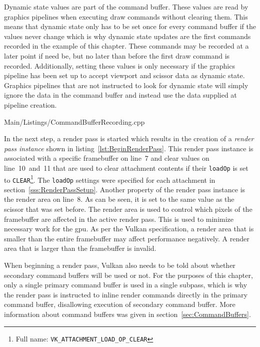       Dynamic state values are part of the command buffer.
      These values are read by graphics pipelines when executing draw commands without clearing them.
      This means that dynamic state only has to be set once for every command buffer if the values never change which is why dynamic state updates are the first commands recorded in the example of this chapter.
      These commands may be recorded at a later point if need be, but no later than before the first draw command is recorded.
      Additionally, setting these values is only necessary if the graphics pipeline has been set up to accept viewport and scissor data as dynamic state.
      Graphics pipelines that are not instructed to look for dynamic state will simply ignore the data in the command buffer and instead use the data supplied at pipeline creation.

      
      {Main/Listings/CommandBufferRecording.cpp}

      In the next step, a render pass is started which results in the creation of a \textit{render pass instance} shown in listing~\ref{lst:BeginRenderPass}.
      This render pass instance is associated with a specific framebuffer on line~7 and clear values on line~10~and~11 that are used to clear attachment contents if their \lstinline{loadOp} is set to \lstinline{CLEAR}\footnote{Full name: \lstinline{VK_ATTACHMENT_LOAD_OP_CLEAR}}.
      The \lstinline{loadOp} settings were specified for each attachment in section~\ref{sss:RenderPassSetup}.
      Another property of the render pass instance is the render area on line~8.
      As can be seen, it is set to the same value as the scissor that was set before.
      The render area is used to control which pixels of the framebuffer are affected in the active render pass.
      This is used to minimize necessary work for the \gls{gpu}.
      As per the Vulkan specification, a render area that is smaller than the entire framebuffer may affect performance negatively.
      A render area that is larger than the framebuffer is invalid.

      When beginning a render pass, Vulkan also needs to be told about whether secondary command buffers will be used or not.
      For the purposes of this chapter, only a single primary command buffer is used in a single subpass, which is why the render pass is instructed to inline render commands directly in the primary command buffer, disallowing execution of secondary command buffer.
      More information about command buffers was given in section~\ref{sec:CommandBuffers}.

